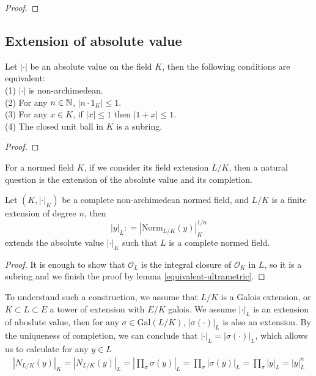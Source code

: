 \begin{proof}
    
\end{proof}

\newpage

\subsection{Extension of absolute value
}

\begin{lemma} \label{equivalent-ultrametric}
    Let \(|\cdot|\) be an absolute value on the field \(K\), then the following conditions are equivalent:\\
    (1) \(|\cdot|\) is non-archimedean. \\
    (2) For any \(n \in \mathbb{N}\), \(|n\cdot 1_K| \leq 1\).\\
    (3) For any \(x \in K\), if \(|x| \leq 1\) then \(|1+x| \leq 1\).\\
    (4) The closed unit ball in \(K\) is a subring.
\end{lemma}

\begin{proof}
    
\end{proof}

For a normed field \(K\), if we consider its field extension \(L/K\), then a natural question is the extension of the absolute value and its completion.

\begin{theorem}
    Let \((K,|\cdot|_K)\) be a complete non-archimedean normed field, and \(L/K\) is a finite extension of degree \(n\), then
    \[|y|_L : = |\mathrm{Norm}_{L/K}(y)|^{1/n}_K\]
    extends the absolute value \(|\cdot|_K\) such that \(L\) is a complete normed field.
\end{theorem}
\begin{proof}
    It is enough to show that \(\mathcal{O}_L\) is the integral closure of \(\mathcal{O}_K\) in \(L\), so it is a subring and we finish the proof by lemma \ref{equivalent-ultrametric}.


\end{proof}

\begin{remark}
    To understand such a construction, we assume that \(L/K\) is a Galois extension, or \(K \subset L \subset E\) a tower of extension with \(E/K\) galois. We assume \(|\cdot|_L\) is an extension of aboslute value, then for any \(\sigma \in \mathrm{Gal}(L/K)\), \(|\sigma(\cdot)|_L\) is also an extension. By the uniqueness of completion, we can conclude that \(|\cdot|_L = |\sigma(\cdot)|_L\), which allows us to calculate for any \(y \in L\)
    \begin{align*}
        |N_{L/K}(y)|_K = |N_{L/K}(y)|_L = |\prod_{\sigma} \sigma(y)|_L = \prod_\sigma |\sigma(y)|_L = \prod_\sigma |y|_L = |y|_L^{n}
    \end{align*}
\end{remark}

